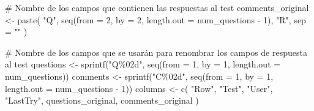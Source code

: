 \documentclass[
  12pt,
  a4paper,
  extrafontsizes,
  onecolumn,
  openright]{memoir}
\newenvironment{Shaded}{\begin{snugshade}}{\end{snugshade}}
\newcommand{\AttributeTok}[1]{\textcolor[rgb]{0.40,0.45,0.13}{#1}}
\newcommand{\CommentTok}[1]{\textcolor[rgb]{0.37,0.37,0.37}{#1}}
\newcommand{\DecValTok}[1]{\textcolor[rgb]{0.68,0.00,0.00}{#1}}
\newcommand{\FunctionTok}[1]{\textcolor[rgb]{0.28,0.35,0.67}{#1}}
\newcommand{\NormalTok}[1]{\textcolor[rgb]{0.00,0.23,0.31}{#1}}
\newcommand{\OtherTok}[1]{\textcolor[rgb]{0.00,0.23,0.31}{#1}}
\newcommand{\SpecialCharTok}[1]{\textcolor[rgb]{0.37,0.37,0.37}{#1}}
\newcommand{\StringTok}[1]{\textcolor[rgb]{0.13,0.47,0.30}{#1}}
\begin{document}
\begin{Shaded}
\begin{Highlighting}[]
\CommentTok{\# Nombre de los campos que contienen las respuestas al test}
\NormalTok{comments\_original }\OtherTok{\textless{}{-}} \FunctionTok{paste}\NormalTok{(}
    \StringTok{"Q"}\NormalTok{, }\FunctionTok{seq}\NormalTok{(}\AttributeTok{from =} \DecValTok{2}\NormalTok{, }\AttributeTok{by =} \DecValTok{2}\NormalTok{, }\AttributeTok{length.out =}\NormalTok{ num\_questions }\SpecialCharTok{{-}} \DecValTok{1}\NormalTok{), }\StringTok{"R"}\NormalTok{, }\AttributeTok{sep =} \StringTok{""}
\NormalTok{) }

\CommentTok{\# Nombre de los campos que se usarán para renombrar los campos de respuesta al test}
\NormalTok{questions }\OtherTok{\textless{}{-}} \FunctionTok{sprintf}\NormalTok{(}\StringTok{"Q\%02d"}\NormalTok{, }\FunctionTok{seq}\NormalTok{(}\AttributeTok{from =} \DecValTok{1}\NormalTok{, }\AttributeTok{by =} \DecValTok{1}\NormalTok{, }\AttributeTok{length.out =}\NormalTok{ num\_questions)) }
\NormalTok{comments }\OtherTok{\textless{}{-}} \FunctionTok{sprintf}\NormalTok{(}\StringTok{"C\%02d"}\NormalTok{, }\FunctionTok{seq}\NormalTok{(}\AttributeTok{from =} \DecValTok{1}\NormalTok{, }\AttributeTok{by =} \DecValTok{1}\NormalTok{, }\AttributeTok{length.out =}\NormalTok{ num\_questions }\SpecialCharTok{{-}} \DecValTok{1}\NormalTok{))}
\NormalTok{columns }\OtherTok{\textless{}{-}} \FunctionTok{c}\NormalTok{(}
    \StringTok{"Row"}\NormalTok{, }\StringTok{"Test"}\NormalTok{, }\StringTok{"User"}\NormalTok{, }\StringTok{"LastTry"}\NormalTok{, questions\_original, comments\_original}
\NormalTok{)}


\end{Highlighting}
\end{Shaded}
\end{document}
